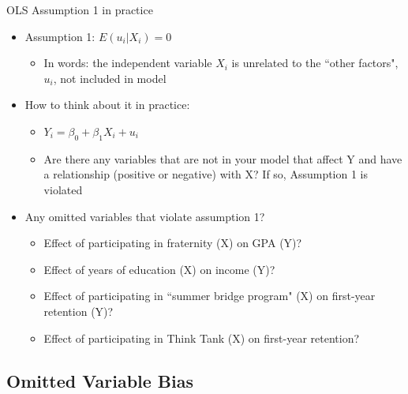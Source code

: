 \begin{frame}{OLS Assumption 1 in practice}
	\begin{itemize}
	\item Assumption 1: $E(u_{i}|X_{i}) = 0$
		\begin{itemize}
		\item In words: the independent variable $X_{i}$ is unrelated to the ``other factors", $u_{i}$, not included in model
		\end{itemize}
	\item How to think about it in practice:
		\begin{itemize}
		\item $Y_{i} = \beta_{0} + \beta_{1}X_{i} + u_{i}$
		\item Are there any variables that are not in your model that affect Y and have a relationship (positive or negative) with X? If so, Assumption 1 is violated
		\end{itemize}	
	\item Any omitted variables that violate assumption 1?
		\begin{itemize}
		\item Effect of participating in fraternity (X) on GPA (Y)?
		\item Effect of years of education (X) on income (Y)?
		\item Effect of participating in ``summer bridge program" (X) on first-year retention (Y)?
		\item Effect of participating in Think Tank (X) on first-year retention?
		\end{itemize}
	\end{itemize}
\end{frame}


\subsection[Omitted Variable Bias]{Omitted Variable Bias}


